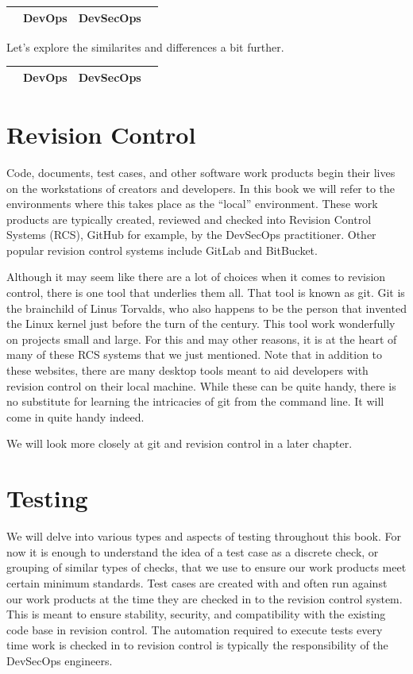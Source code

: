 \begin{tabular}{|l|c|c|l|}\hline
    & DevOps & DevSecOps & \\\hline
\end{tabular}

\justify{}
Let's explore the similarites and differences a bit further.


\begin{tabular}{|l|c|c|l|}\hline
    & DevOps & DevSecOps & \\\hline
\end{tabular}

\section{Revision Control}

\justify{}
Code, documents, test cases, and other software work products begin their lives on the workstations of creators
and developers. In this book we will refer to the environments where this takes place as the ``local'' environment.
These work products are typically created, reviewed and checked into Revision Control Systems 
(RCS), GitHub for example, by the DevSecOps practitioner. 
Other popular revision control systems include GitLab and BitBucket.

\justify{}
Although it may seem like there are a lot of choices when it comes to revision control, there is one tool that
underlies them all. That tool is known as git. Git is the brainchild of Linus Torvalds, who also happens to be
the person that invented the Linux kernel just before the turn of the century. This tool work wonderfully on projects small
and large. For this and may other reasons, it is at the heart of many of these RCS systems that we just mentioned. Note that
in addition to these websites, there are many desktop tools meant to aid developers with revision control on their local
machine. While these can be quite handy, there is no substitute for learning the intricacies of git from the command
line. It will come in quite handy indeed.

We will look more closely at git and revision control in a later chapter.

\section{Testing}

\justify{}
We will delve into various types and aspects of testing throughout this book. For now it is enough
to understand the idea of a test case as a discrete check, or grouping of similar types of checks,
that we use to ensure our work products meet certain minimum standards.  Test cases are created with
and often run against our work products at the time they are checked in to the revision control system.
This is meant to ensure stability, security, and compatibility with the existing code base in revision
control. The automation required to execute tests every time work is checked in to
revision control is typically the responsibility of the DevSecOps engineers.

